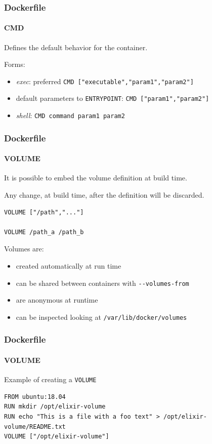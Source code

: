 \begin{frame}[fragile]
\frametitle{Dockerfile}
\framesubtitle{CMD}
Defines the default behavior for the container.

Forms:
\begin{itemize}
\item \textit{exec}: preferred \lstinline!CMD ["executable","param1","param2"]!
\item default parameters to \lstinline!ENTRYPOINT!: \lstinline!CMD ["param1","param2"]!
\item \textit{shell}: \lstinline!CMD command param1 param2!
\end{itemize}
\end{frame}

\begin{frame}[fragile]
\frametitle{Dockerfile}
\framesubtitle{VOLUME}
It is possible to embed the volume definition at build time.

Any change, at build time, after the definition will be discarded.

\begin{lstlisting}
VOLUME ["/path","..."]

VOLUME /path_a /path_b
\end{lstlisting}

Volumes are:
\begin{itemize}
\item created automatically at run time
\item can be shared between containers with \lstinline!--volumes-from!
\item are anonymous at runtime
\item can be inspected looking at \lstinline!/var/lib/docker/volumes!
\end{itemize}
\end{frame}

\begin{frame}[fragile]
\frametitle{Dockerfile}
\framesubtitle{VOLUME}

Example of creating a \lstinline!VOLUME!

\begin{lstlisting}
FROM ubuntu:18.04
RUN mkdir /opt/elixir-volume
RUN echo "This is a file with a foo text" > /opt/elixir-volume/README.txt
VOLUME ["/opt/elixir-volume"]
\end{lstlisting}
\end{frame}

